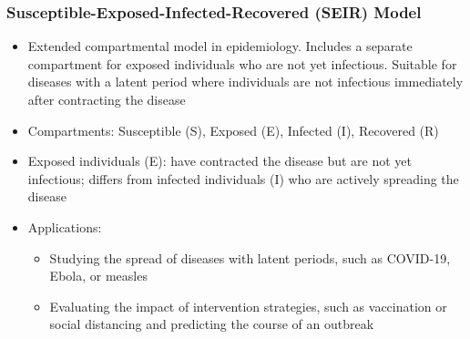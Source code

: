 \begin{frame}
  \frametitle{Susceptible-Exposed-Infected-Recovered (SEIR) Model}
  \begin{itemize}
    \item Extended compartmental model in epidemiology. Includes a separate compartment for exposed individuals who are not yet infectious. Suitable for diseases with a latent period where individuals are not infectious immediately after contracting the disease
        
    \item Compartments: Susceptible (S), Exposed (E), Infected (I), Recovered (R)
    \item Exposed individuals (E): have contracted the disease but are not yet infectious; differs from infected individuals (I) who are actively spreading the disease
    \item Applications:
      \begin{itemize}
        \item Studying the spread of diseases with latent periods, such as COVID-19, Ebola, or measles
        \item Evaluating the impact of intervention strategies, such as vaccination or social distancing and predicting the course of an outbreak
      \end{itemize}
  \end{itemize}
\end{frame}


